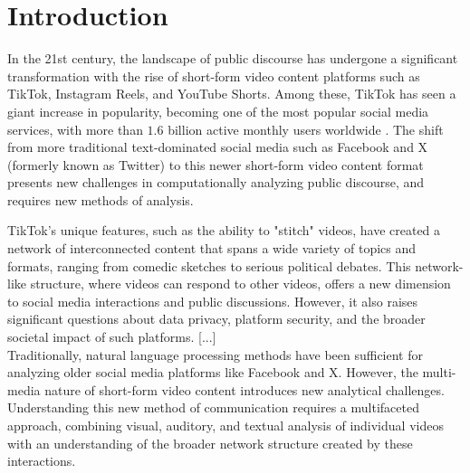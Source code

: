 \chapter{Introduction}






In the 21st century, the landscape of public discourse has undergone a significant transformation with the rise of short-form video content platforms such as TikTok, Instagram Reels, and YouTube Shorts. Among these, TikTok has seen a giant increase in popularity, becoming one of the most popular social media services, with more than $1.6$ billion active monthly users worldwide \citep{tiktok_popular}. The shift from more traditional text-dominated social media such as Facebook and X (formerly known as Twitter) to this newer short-form video content format presents new challenges in computationally analyzing public discourse, and requires new methods of analysis.

TikTok's unique features, such as the ability to "stitch" videos, have created a network of interconnected content that spans a wide variety of topics and formats, ranging from comedic sketches to serious political debates. This network-like structure, where videos can respond to other videos, offers a new dimension to social media interactions and public discussions. However, it also raises significant questions about data privacy, platform security, and the broader societal impact of such platforms. [...]\\
Traditionally, natural language processing methods have been sufficient for analyzing older social media platforms like Facebook and X. However, the multi-media nature of short-form video content introduces new analytical challenges. Understanding this new method of communication requires a multifaceted approach, combining visual, auditory, and textual analysis of individual videos with an understanding of the broader network structure created by these interactions.

